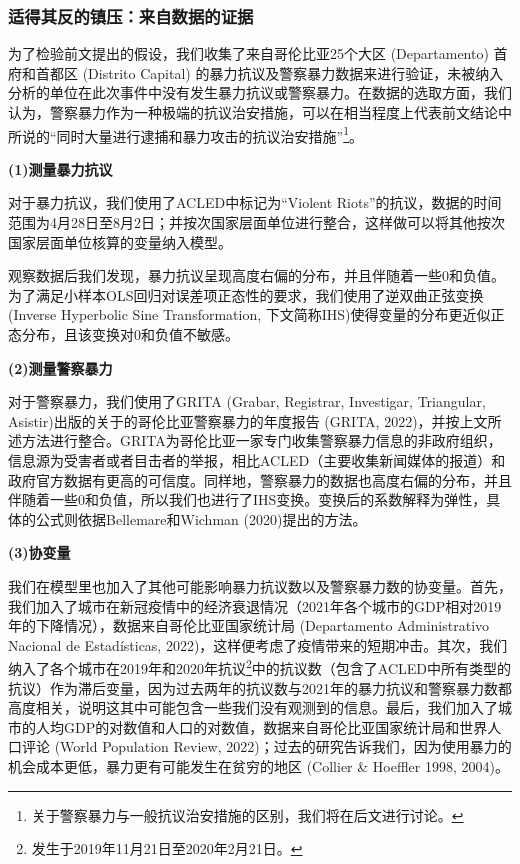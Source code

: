 \documentclass{phyasgn}\usepackage{nag}
\begin{document}
\subsubsection{适得其反的镇压：来自数据的证据}
为了检验前文提出的假设，我们收集了来自哥伦比亚25个大区 (Departamento) 首府和首都区 (Distrito Capital) 的暴力抗议及警察暴力数据来进行验证，未被纳入分析的单位在此次事件中没有发生暴力抗议或警察暴力。在数据的选取方面，我们认为，警察暴力作为一种极端的抗议治安措施，可以在相当程度上代表前文结论中所说的“同时大量进行逮捕和暴力攻击的抗议治安措施”\footnote[66]{关于警察暴力与一般抗议治安措施的区别，我们将在后文进行讨论。}。
\par \textbf{(1)测量暴力抗议}
\par 对于暴力抗议，我们使用了ACLED中标记为“Violent Riots”的抗议，数据的时间范围为4月28日至8月2日；并按次国家层面单位进行整合，这样做可以将其他按次国家层面单位核算的变量纳入模型。
\par 观察数据后我们发现，暴力抗议呈现高度右偏的分布，并且伴随着一些0和负值。为了满足小样本OLS回归对误差项正态性的要求，我们使用了逆双曲正弦变换 (Inverse Hyperbolic Sine Transformation, 下文简称IHS)使得变量的分布更近似正态分布，且该变换对0和负值不敏感。
\par \textbf{(2)测量警察暴力}
\par 对于警察暴力，我们使用了GRITA (Grabar, Registrar, Investigar, Triangular, Asistir)出版的关于的哥伦比亚警察暴力的年度报告 (GRITA, 2022)，并按上文所述方法进行整合。GRITA为哥伦比亚一家专门收集警察暴力信息的非政府组织，信息源为受害者或者目击者的举报，相比ACLED（主要收集新闻媒体的报道）和政府官方数据有更高的可信度。同样地，警察暴力的数据也高度右偏的分布，并且伴随着一些0和负值，所以我们也进行了IHS变换。变换后的系数解释为弹性，具体的公式则依据Bellemare和Wichman (2020)提出的方法。
\par \textbf{(3)协变量}
\par 我们在模型里也加入了其他可能影响暴力抗议数以及警察暴力数的协变量。首先，我们加入了城市在新冠疫情中的经济衰退情况（2021年各个城市的GDP相对2019年的下降情况），数据来自哥伦比亚国家统计局 (Departamento Administrativo Nacional de Estadísticas, 2022)，这样便考虑了疫情带来的短期冲击。其次，我们纳入了各个城市在2019年和2020年抗议\footnote[67]{发生于2019年11月21日至2020年2月21日。}中的抗议数（包含了ACLED中所有类型的抗议）作为滞后变量，因为过去两年的抗议数与2021年的暴力抗议和警察暴力数都高度相关，说明这其中可能包含一些我们没有观测到的信息。最后，我们加入了城市的人均GDP的对数值和人口的对数值，数据来自哥伦比亚国家统计局和世界人口评论 (World Population Review, 2022)；过去的研究告诉我们，因为使用暴力的机会成本更低，暴力更有可能发生在贫穷的地区 (Collier \& Hoeffler 1998, 2004)。
\end{document}
